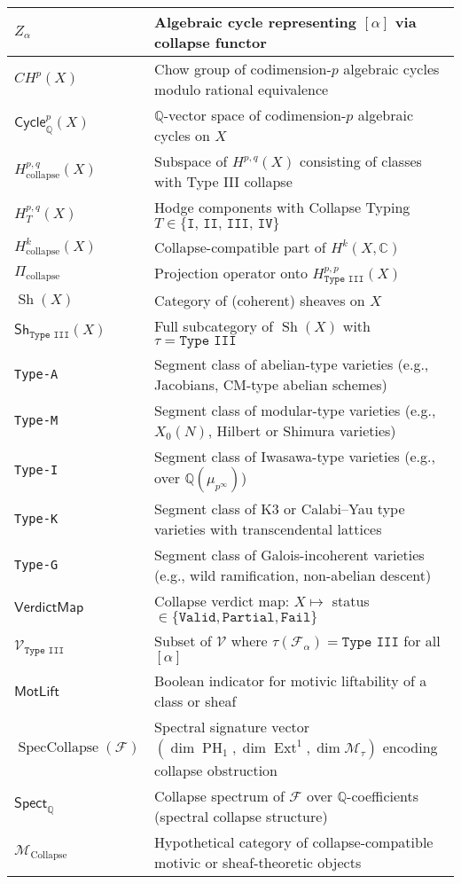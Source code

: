\documentclass[11pt]{article}
\DeclareMathOperator{\Ext}{Ext}
\DeclareMathOperator{\PH}{PH}
\begin{document}
\begin{longtable}{|p{3cm}|p{12cm}|}
\hline
$Z_\alpha$ & Algebraic cycle representing $[\alpha]$ via collapse functor \\
\hline
$CH^p(X)$ & Chow group of codimension-$p$ algebraic cycles modulo rational equivalence \\
\hline
$\mathsf{Cycle}^p_{\mathbb{Q}}(X)$ & $\mathbb{Q}$-vector space of codimension-$p$ algebraic cycles on $X$ \\
\hline
$H^{p,q}_{\text{collapse}}(X)$ & Subspace of $H^{p,q}(X)$ consisting of classes with Type III collapse \\
\hline
$H^{p,q}_T(X)$ & Hodge components with Collapse Typing $T \in \{\texttt{I, II, III, IV}\}$ \\
\hline
$H^k_{\text{collapse}}(X)$ & Collapse-compatible part of $H^k(X, \mathbb{C})$ \\
\hline
$\Pi_{\text{collapse}}$ & Projection operator onto $H^{p,p}_{\texttt{Type III}}(X)$ \\
\hline
$\operatorname{Sh}(X)$ & Category of (coherent) sheaves on $X$ \\
\hline
$\mathsf{Sh}_{\texttt{Type III}}(X)$ & Full subcategory of $\operatorname{Sh}(X)$ with $\tau = \texttt{Type III}$ \\
\hline
\texttt{Type-A} & Segment class of abelian-type varieties (e.g., Jacobians, CM-type abelian schemes) \\
\hline
\texttt{Type-M} & Segment class of modular-type varieties (e.g., $X_0(N)$, Hilbert or Shimura varieties) \\
\hline
\texttt{Type-I} & Segment class of Iwasawa-type varieties (e.g., over $\mathbb{Q}(\mu_{p^\infty})$) \\
\hline
\texttt{Type-K} & Segment class of K3 or Calabi–Yau type varieties with transcendental lattices \\
\hline
\texttt{Type-G} & Segment class of Galois-incoherent varieties (e.g., wild ramification, non-abelian descent) \\
\hline
$\mathsf{VerdictMap}$ & Collapse verdict map: $X \mapsto$ status $\in \{\texttt{Valid}, \texttt{Partial}, \texttt{Fail}\}$ \\
\hline
$\mathcal{V}_{\texttt{Type III}}$ & Subset of $\mathcal{V}$ where $\tau(\mathcal{F}_\alpha) = \texttt{Type III}$ for all $[\alpha]$ \\
\hline
$\mathsf{MotLift}$ & Boolean indicator for motivic liftability of a class or sheaf \\
\hline
$\operatorname{SpecCollapse}(\mathcal{F})$ & Spectral signature vector $(\dim \PH_1, \dim \Ext^1, \dim \mathcal{M}_\tau)$ encoding collapse obstruction \\
\hline
$\mathsf{Spect}_{\mathbb{Q}}$ & Collapse spectrum of $\mathcal{F}$ over $\mathbb{Q}$-coefficients (spectral collapse structure) \\
\hline
$\mathcal{M}_{\text{Collapse}}$ & Hypothetical category of collapse-compatible motivic or sheaf-theoretic objects \\
\hline
\end{longtable}
\end{document}
